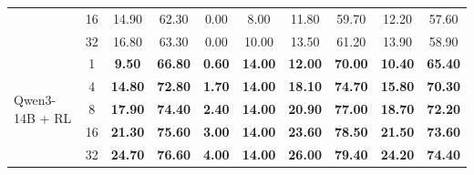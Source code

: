 \begin{table}[H]
\begin{tabular}{lccccccccc}
 & 16 & 14.90 & 62.30 & 0.00 & 8.00  & 11.80 & 59.70 & 12.20 & 57.60 \\
 & 32 & 16.80 & 63.30 & 0.00 & 10.00 & 13.50 & 61.20 & 13.90 & 58.90 \\
\cmidrule(l{3pt}r{3pt}){1-10}
\multirow{5}{*}{Qwen3-14B + RL}
 & 1  & \textbf{9.50} & \textbf{66.80} & \textbf{0.60} & \textbf{14.00} & \textbf{12.00} & \textbf{70.00} & \textbf{10.40} & \textbf{65.40} \\
 & 4  & \textbf{14.80} & \textbf{72.80} & \textbf{1.70} & \textbf{14.00} & \textbf{18.10} & \textbf{74.70} & \textbf{15.80} & \textbf{70.30} \\
 & 8  & \textbf{17.90} & \textbf{74.40} & \textbf{2.40} & \textbf{14.00} & \textbf{20.90} & \textbf{77.00} & \textbf{18.70} & \textbf{72.20} \\
 & 16 & \textbf{21.30} & \textbf{75.60} & \textbf{3.00} & \textbf{14.00} & \textbf{23.60} & \textbf{78.50} & \textbf{21.50} & \textbf{73.60} \\
 & 32 & \textbf{24.70} & \textbf{76.60} & \textbf{4.00} & \textbf{14.00} & \textbf{26.00} & \textbf{79.40} & \textbf{24.20} & \textbf{74.40} \\
\bottomrule
\end{tabular}
\end{table}

